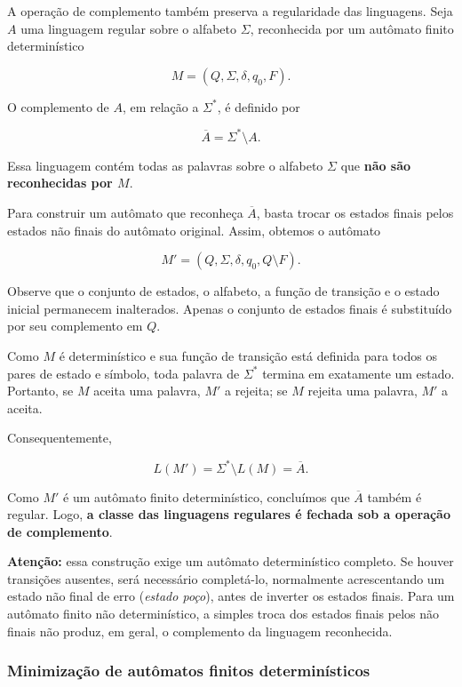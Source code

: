 \documentclass[
  brazilian,
  letterpaper,
]{book}
\theoremstyle{plain}
\theoremstyle{definition}
\theoremstyle{remark}
\begin{document}
A operação de complemento também preserva a regularidade das linguagens.
Seja \(A\) uma linguagem regular sobre o alfabeto \(\Sigma\),
reconhecida por um autômato finito determinístico

\[
M = (Q,\Sigma,\delta,q_0,F).
\]

O complemento de \(A\), em relação a \(\Sigma^*\), é definido por

\[
\overline{A} = \Sigma^* \setminus A.
\]

Essa linguagem contém todas as palavras sobre o alfabeto \(\Sigma\) que
\textbf{não são reconhecidas por \(M\)}.

Para construir um autômato que reconheça \(\overline{A}\), basta trocar
os estados finais pelos estados não finais do autômato original. Assim,
obtemos o autômato

\[
M' = (Q,\Sigma,\delta,q_0,Q \setminus F).
\]

Observe que o conjunto de estados, o alfabeto, a função de transição e o
estado inicial permanecem inalterados. Apenas o conjunto de estados
finais é substituído por seu complemento em \(Q\).

Como \(M\) é determinístico e sua função de transição está definida para
todos os pares de estado e símbolo, toda palavra de \(\Sigma^*\) termina
em exatamente um estado. Portanto, se \(M\) aceita uma palavra, \(M'\) a
rejeita; se \(M\) rejeita uma palavra, \(M'\) a aceita.

Consequentemente,

\[
L(M') = \Sigma^* \setminus L(M) = \overline{A}.
\]

Como \(M'\) é um autômato finito determinístico, concluímos que
\(\overline{A}\) também é regular. Logo, \textbf{a classe das linguagens
regulares é fechada sob a operação de complemento}.

\textbf{Atenção:} essa construção exige um autômato determinístico
completo. Se houver transições ausentes, será necessário completá-lo,
normalmente acrescentando um estado não final de erro (\emph{estado
poço}), antes de inverter os estados finais. Para um autômato finito não
determinístico, a simples troca dos estados finais pelos não finais não
produz, em geral, o complemento da linguagem reconhecida.

\subsubsection{Minimização de autômatos finitos
determinísticos}\label{minimizauxe7uxe3o-de-autuxf4matos-finitos-determinuxedsticos}
\end{document}
